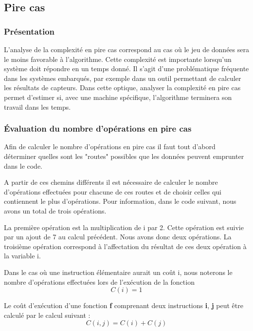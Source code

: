 \documentclass[12pt, twoside, openright]{report}
\begin{document}
\subsection{Pire cas}

\subsubsection{Présentation}

L'analyse de la complexité en pire cas correspond au cas où le jeu de données sera le moins favorable à l'algorithme. Cette complexité est importante lorsqu'un système doit répondre en un temps donné. Il s'agit d'une problématique fréquente dans les systèmes embarqués, par exemple dans un outil permettant de calculer les résultats de capteurs. Dans cette optique, analyser la complexité en pire cas permet d'estimer si, avec une machine spécifique, l'algorithme terminera son travail dans les temps. 

\subsubsection{Évaluation du nombre d'opérations en pire cas}

Afin de calculer le nombre d'opérations en pire cas il faut tout d'abord déterminer quelles sont les "routes" possibles que les données peuvent emprunter dans le code.

A partir de ces chemins différents il est nécessaire de calculer le nombre d'opérations effectuées pour chacune de ces routes et de choisir celles qui contiennent le plus d'opérations. Pour information, dans le code suivant, nous avons un total de trois opérations.



La première opération est la multiplication de i par 2. Cette opération est suivie par un ajout de 7 au calcul précédent. Nous avons donc deux opérations. La troisième opération correspond à l'affectation du résultat de ces deux opération à la variable i. 

Dans le cas où une instruction élémentaire aurait un coût i, nous noterons le nombre d'opérations effectuées lors de l'exécution de la fonction 
\[{C(i)=1}\]

Le coût d'exécution d'une fonction \textbf{f} comprenant deux instructions  \textbf{i}, \textbf{j} peut être calculé par le calcul suivant : 
\[{C(i,j)=C(i)+C(j)}\]
\end{document}
